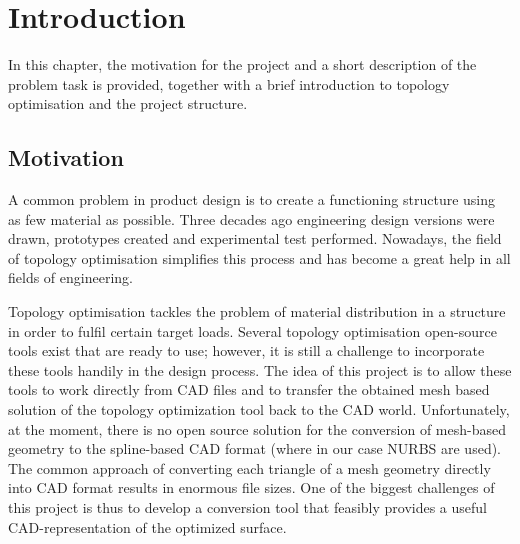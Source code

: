 \chapter{Introduction}
\label{chapter:Introduction}
In this chapter, the motivation for the project and a short description of the problem task is provided, together with a brief introduction to topology optimisation and the project structure.
\section{Motivation}
A common problem in product design is to create a functioning structure using as few material as possible. Three decades ago engineering design versions were drawn, prototypes created and experimental test performed. Nowadays, the field of topology optimisation simplifies this process and has become a great help in all fields of engineering. 

Topology optimisation tackles the problem of material distribution in a structure in order to fulfil certain target loads. Several topology optimisation open-source tools exist that are ready to use; however, it is still a challenge to incorporate these tools handily in the design process. The idea of this project is to allow these tools to work directly from \acf{CAD} files and to transfer the obtained mesh based solution of the topology optimization tool back to the \ac{CAD} world. Unfortunately, at the moment, there is no open source solution for the conversion of mesh-based geometry to the spline-based \ac{CAD} format (where in our case \ac{NURBS} are used). The common approach of converting each triangle of a mesh geometry directly into \ac{CAD} format results in enormous file sizes. One of the biggest challenges of this project is thus to develop a conversion tool that feasibly provides a useful \ac{CAD}-representation of the optimized surface.


%
%

